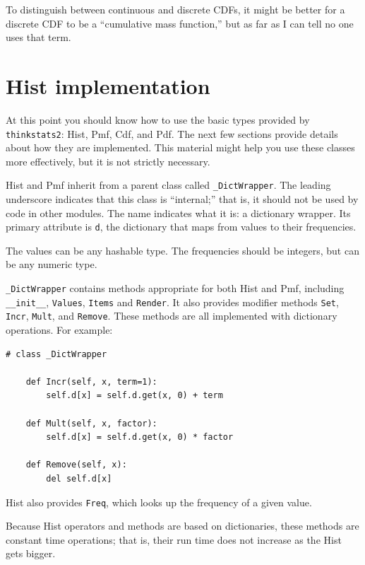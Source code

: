 \documentclass[12pt]{book}
\begin{document}
To distinguish between continuous and discrete CDFs, it might be
better for a discrete CDF to be a ``cumulative mass function,'' but as
far as I can tell no one uses that term.  



\section{Hist implementation}

At this point you should know how to use the basic types provided
by {\tt thinkstats2}: Hist, Pmf, Cdf, and Pdf.  The next few sections
provide details about how they are implemented.  This material
might help you use these classes more effectively, but it is not
strictly necessary.

Hist and Pmf inherit from a parent class called \verb"_DictWrapper".
The leading underscore indicates that this class is ``internal;'' that
is, it should not be used by code in other modules.  The name
indicates what it is: a dictionary wrapper.  Its primary attribute is
{\tt d}, the dictionary that maps from values to their frequencies.

The values can be any hashable type.  The frequencies should be integers,
but can be any numeric type.

\verb"_DictWrapper" contains methods appropriate for both
Hist and Pmf, including \verb"__init__", {\tt Values},
{\tt Items} and {\tt Render}.  It also provides modifier
methods {\tt Set}, {\tt Incr}, {\tt Mult}, and {\tt Remove}.  These
methods are all implemented with dictionary operations.  For example:

\begin{verbatim}
# class _DictWrapper

    def Incr(self, x, term=1):
        self.d[x] = self.d.get(x, 0) + term

    def Mult(self, x, factor):
        self.d[x] = self.d.get(x, 0) * factor

    def Remove(self, x):
        del self.d[x]
\end{verbatim}

Hist also provides {\tt Freq}, which looks up the frequency
of a given value.

Because Hist operators and methods are based on dictionaries,
these methods are constant time operations;
that is, their run time does not increase as the Hist gets bigger.
\end{document}
